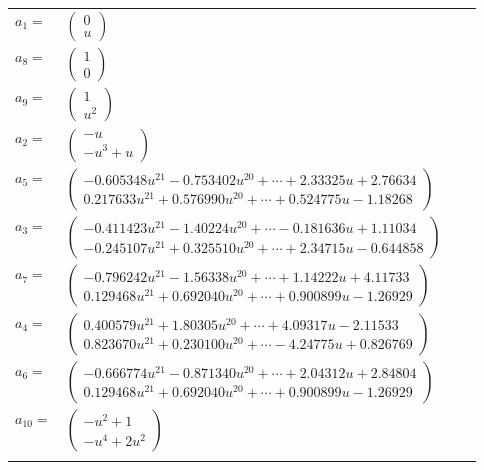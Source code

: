 \documentclass[1p]{elsarticle_modified}
\theoremstyle{definition}
\begin{document}
\begin{tabular}{m{7pt} m{180pt} m{7pt} m{180pt} }
\flushright $a_{1}=$&$\begin{pmatrix}0\\u\end{pmatrix}$ \\
\flushright $a_{8}=$&$\begin{pmatrix}1\\0\end{pmatrix}$ \\
\flushright $a_{9}=$&$\begin{pmatrix}1\\u^2\end{pmatrix}$ \\
\flushright $a_{2}=$&$\begin{pmatrix}- u\\- u^3+u\end{pmatrix}$ \\
\flushright $a_{5}=$&$\begin{pmatrix}-0.605348 u^{21}-0.753402 u^{20}+\cdots+2.33325 u+2.76634\\0.217633 u^{21}+0.576990 u^{20}+\cdots+0.524775 u-1.18268\end{pmatrix}$ \\
\flushright $a_{3}=$&$\begin{pmatrix}-0.411423 u^{21}-1.40224 u^{20}+\cdots-0.181636 u+1.11034\\-0.245107 u^{21}+0.325510 u^{20}+\cdots+2.34715 u-0.644858\end{pmatrix}$ \\
\flushright $a_{7}=$&$\begin{pmatrix}-0.796242 u^{21}-1.56338 u^{20}+\cdots+1.14222 u+4.11733\\0.129468 u^{21}+0.692040 u^{20}+\cdots+0.900899 u-1.26929\end{pmatrix}$ \\
\flushright $a_{4}=$&$\begin{pmatrix}0.400579 u^{21}+1.80305 u^{20}+\cdots+4.09317 u-2.11533\\0.823670 u^{21}+0.230100 u^{20}+\cdots-4.24775 u+0.826769\end{pmatrix}$ \\
\flushright $a_{6}=$&$\begin{pmatrix}-0.666774 u^{21}-0.871340 u^{20}+\cdots+2.04312 u+2.84804\\0.129468 u^{21}+0.692040 u^{20}+\cdots+0.900899 u-1.26929\end{pmatrix}$ \\
\flushright $a_{10}=$&$\begin{pmatrix}- u^2+1\\- u^4+2 u^2\end{pmatrix}$\\&\end{tabular}
\end{document}
